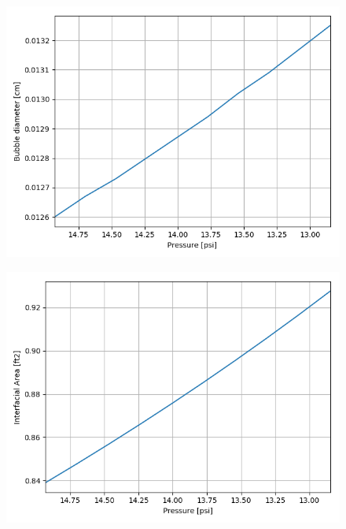 \begin{figure}[p] 
\centering
\begin{minipage}{.5\textwidth}
  \centering
  \includegraphics[width=.9\linewidth]{images/BubbleDiaPressureDecrease.png}
  \label{fig:press_decrease_bubDia}
\end{minipage}%
\begin{minipage}{.5\textwidth}
  \centering
  \includegraphics[width=.9\linewidth]{images/IntAreaPressureDecrease.png}
  \label{fig:press_decrease_intArea}
\end{minipage}
\end{figure}

\FloatBarrier
\newpage
\FloatBarrier



